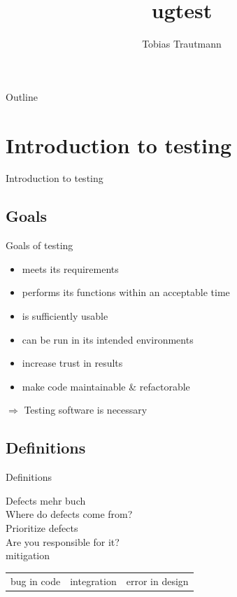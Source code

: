 \documentclass{beamer}
\title[ugtest]{ugtest}
\author{Tobias Trautmann}
\institute{GCSC}
\newcommand{\sectiontitle}[1]{
    \section{#1}
    \begin{frame}
        \centering
        \LARGE{#1}
    \end{frame}
}
\newcommand{\subsectiontitle}[1]{
    \subsection{#1}
    \begin{frame}
        \LARGE{#1}
    \end{frame}
}
\begin{document}
    \begin{frame}
        \titlepage
    \end{frame}

    \begin{frame}{Outline}
        \tableofcontents
    \end{frame}


    \sectiontitle{Introduction to testing}
        \subsection{Goals}
        \begin{frame}{Goals of testing}
           \begin{itemize}
               \item meets its requirements\pause
               \item performs its functions within an acceptable time\pause
               \item is sufficiently usable\pause
               \item can be run in its intended environments\pause
               \item increase trust in results\pause
               \item make code maintainable \& refactorable\pause
           \end{itemize}
           \Large{$\Rightarrow$ Testing software is necessary}
        \end{frame}

        \subsectiontitle{Definitions}
        \begin{frame}{Defects}
            mehr buch\\
            Where do defects come from?\\
            Prioritize defects\\
            Are you responsible for it?\\
            mitigation
            \begin{tabular}{c|c|c}
                bug in code   & integration & error in design \\
            \end{tabular}
        \end{frame}
\end{document}

